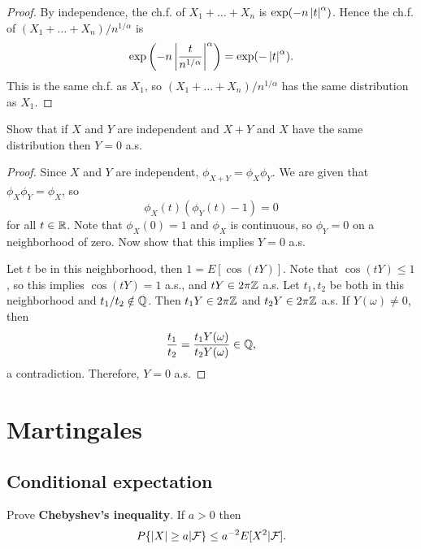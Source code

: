\documentclass[a4paper]{article}
\begin{document}
\begin{proof}
  By independence, the ch.f. of $X_1 + \dots + X_n$ is
  $\exp ( - n \left\lvert t\right\rvert^\alpha )$. Hence the ch.f. of
  $(X_1 + \dots + X_n) / n^{1 / \alpha}$ is
  \[
    \exp \left( - n \left\lvert \frac{t}{n^{1 / \alpha}}\right\rvert^\alpha \right)
    = \exp (- \left\lvert t\right\rvert^\alpha ).
  \]
  This is the same ch.f. as $X_1$, so
  $(X_1 + \dots + X_n) / n^{1 / \alpha}$ has the same distribution
  as $X_1$.

\end{proof}

\begin{ex}[Durrett 3.3.23]
  Show that if $X$ and $Y$ are independent and $X + Y$ and
  $X$ have the same distribution then $Y = 0$ a.s.
\end{ex}

\begin{proof}
  Since $X$ and $Y$ are independent, $\phi_{X + Y} = \phi_X \phi_Y$.
  We are given that $\phi_X \phi_Y = \phi_X$, so
  \[
    \phi_X (t) (\phi_Y (t) - 1) = 0
  \]
  for all $t \in \mathbb{R}$. Note that $\phi_X(0) = 1$ and $\phi_X$ is
  continuous, so $\phi_Y = 0$ on a neighborhood of zero.
  Now show that this implies $Y = 0$ a.s.

  Let $t$ be in this neighborhood, then $1 = E[\cos (t Y)]$.
  Note that $\cos (t Y) \leq 1$, so this implies
  $\cos (t Y) = 1$ a.s., and $t Y \in 2 \pi \mathbb{Z}$ a.s. Let
  $t_1, t_2$ be both in this neighborhood and $t_1 / t_2 \notin \mathbb{Q}$.
  Then $t_1 Y \in 2 \pi \mathbb{Z}$ and $t_2 Y \in 2 \pi \mathbb{Z}$ a.s. If
  $Y(\omega) \neq 0$, then
  \[
    \frac{t_1}{t_2} = \frac{t_1 Y(\omega)}{t_2 Y(\omega)} \in \mathbb{Q},
  \]
  a contradiction. Therefore, $Y = 0$ a.s.

\end{proof}

\section{Martingales}

\subsection{Conditional expectation}

\begin{ex}[Durrett 4.1.2]
  Prove \textbf{Chebyshev's inequality}. If $a > 0$ then
  \[
    P \{ \left\lvert X\right\rvert \geq a | \mathcal{F} \} \leq a^{-2} E[X^2 | \mathcal{F}].
  \]
\end{ex}
\end{document}
